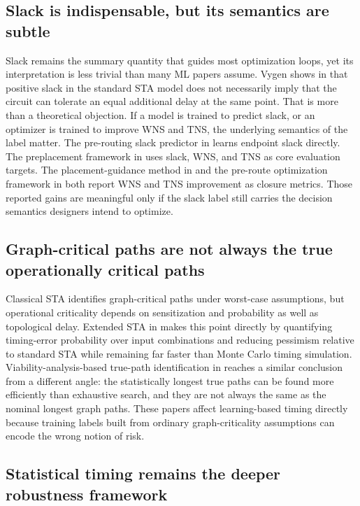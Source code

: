 \documentclass[num-refs]{wiley-article}
\begin{document}
  \subsection{Slack is indispensable, but its semantics are subtle}

  Slack remains the summary quantity that guides most optimization loops, yet its interpretation is less trivial than many ML papers assume. Vygen shows in \cite{ref50} that positive slack in the standard STA model does not necessarily imply that the circuit can tolerate an equal additional delay at the same point. That is more than a theoretical objection. If a model is trained to predict slack, or an optimizer is trained to improve WNS and TNS, the underlying semantics of the label matter. The pre-routing slack predictor in \cite{ref5} learns endpoint slack directly. The preplacement framework in \cite{ref29} uses slack, WNS, and TNS as core evaluation targets. The placement-guidance method in \cite{ref1} and the pre-route optimization framework in \cite{ref17} both report WNS and TNS improvement as closure metrics. Those reported gains are meaningful only if the slack label still carries the decision semantics designers intend to optimize.


  \subsection{Graph-critical paths are not always the true operationally critical paths}

  Classical STA identifies graph-critical paths under worst-case assumptions, but operational criticality depends on sensitization and probability as well as topological delay. Extended STA in \cite{ref37} makes this point directly by quantifying timing-error probability over input combinations and reducing pessimism relative to standard STA while remaining far faster than Monte Carlo timing simulation. Viability-analysis-based true-path identification in \cite{ref40} reaches a similar conclusion from a different angle: the statistically longest true paths can be found more efficiently than exhaustive search, and they are not always the same as the nominal longest graph paths. These papers affect learning-based timing directly because training labels built from ordinary graph-criticality assumptions can encode the wrong notion of risk.


  \subsection{Statistical timing remains the deeper robustness framework}
\end{document}
